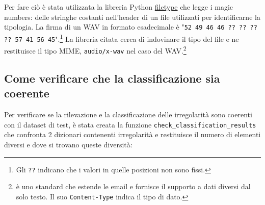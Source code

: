 Per fare ciò è stata utilizzata la libreria Python \href{https://github.com/h2non/filetype.py}{filetype} che legge i magic numbers: delle stringhe costanti nell'header di un file utilizzati per identificarne la tipologia.
La firma di un WAV in formato esadecimale è "\texttt{52 49 46 46 ?? ?? ?? ?? 57 41 56 45}".\footnote{Gli \texttt{??} indicano che i valori in quelle posizioni non sono fissi.}
La libreria citata cerca di indovinare il tipo del file e ne restituisce il tipo \acs{MIME}, \texttt{audio/x-wav} nel caso del WAV.\footnote{ è uno standard che estende le email e fornisce il supporto a dati diversi dal solo testo. Il suo \texttt{Content-Type} indica il tipo di dato.}


\subsection{Come verificare che la classificazione sia coerente} \label{ssec:audio-analyser-classificazione}    %
Per verificare se la rilevazione e la classificazione delle irregolarità sono coerenti con il dataset di test, è stata creata la funzione \verb|check_classification_results| che confronta 2 dizionari contenenti irregolarità e restituisce il numero di elementi diversi e dove si trovano queste diversità:
